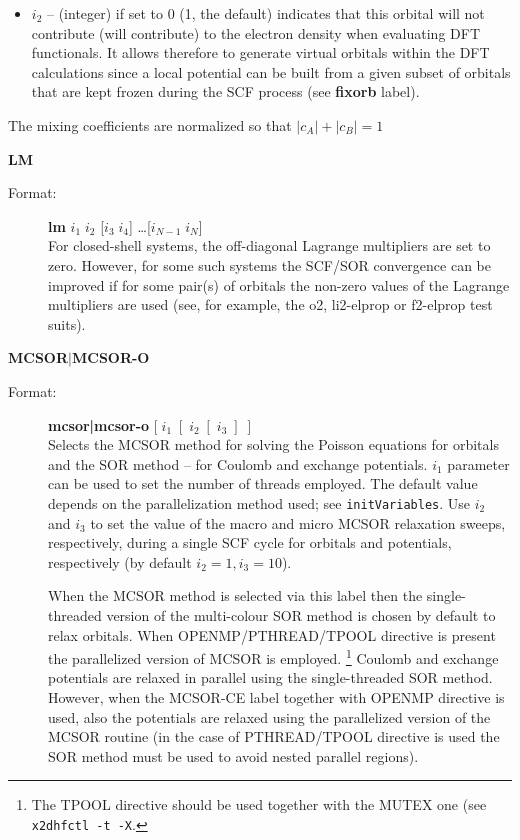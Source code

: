 \documentclass[10pt,a4paper]{article}
\newcommand{\ft}[1]{\texttt{#1}}
\newcommand{\fb}[1]{\textbf{#1}}
\begin{document}
\begin{description}
\begin{description}
\begin{description}
\begin{itemize}
\item[] $i_2$ -- (integer) if set to 0 (1, the default) indicates that this
  orbital will not contribute (will contribute) to the electron density
  when evaluating DFT functionals. It allows therefore to generate virtual
  orbitals within the DFT calculations since a local potential can be built
  from a given subset of orbitals that are kept frozen during the SCF
  process (see \fb{fixorb} label).
\end{itemize}
The mixing coefficients are normalized so that $|c_A|+|c_B|=1$

\end{description}
\end{description}

\item \textbf{LM}
\begin{description}
\item[Format:] \textbf{lm} $i_1 \; i_2$ [\;$i_3 \;i_4$\;] \ldots [\;$i_{N-1} \;i_{N}$\;] \\
  For closed-shell systems, the off-diagonal Lagrange multipliers are set to
  zero. However, for some such systems the SCF/SOR convergence can be
  improved if for some pair(s) of orbitals the non-zero values of the
  Lagrange multipliers are used (see, for example, the o2, li2-elprop or
  f2-elprop test suits).
\end{description}

\item \textbf{MCSOR$|$MCSOR-O}
\begin{description}
\item[Format:] \textbf{mcsor|mcsor-o} $[\;i_1\;[\;i_2\;[\;i_3\;]\;]$\\
  Selects the MCSOR method for solving the Poisson equations for orbitals
  and the SOR method -- for Coulomb and exchange potentials. $i_1$
  parameter can be used to set the number of threads employed. The default
  value depends on the parallelization method used; see
  \ft{initVariables}. Use $i_2$ and $i_3$ to set the value of the 
  macro and micro MCSOR relaxation sweeps, respectively, during a single SCF
  cycle for orbitals and potentials, respectively (by default
  $i_2=1, i_3=10$).

  When the MCSOR method is selected via this label then the single-threaded
  version of the multi-colour SOR method is chosen by default to relax
  orbitals. When OPENMP/PTHREAD/TPOOL directive is present the parallelized
  version of MCSOR is employed.%
  \footnote{The TPOOL directive should be used together with the MUTEX one
    (see \ft{x2dhfctl -t -X}.}  Coulomb and exchange potentials are relaxed
  in parallel using the single-threaded SOR method. However, when the
  MCSOR-CE label together with OPENMP directive is used, also the
  potentials are relaxed using the parallelized version of the MCSOR
  routine (in the case of PTHREAD/TPOOL directive is used the SOR method
  must be used to avoid nested parallel regions).


\end{description}
\end{description}
\end{document}
